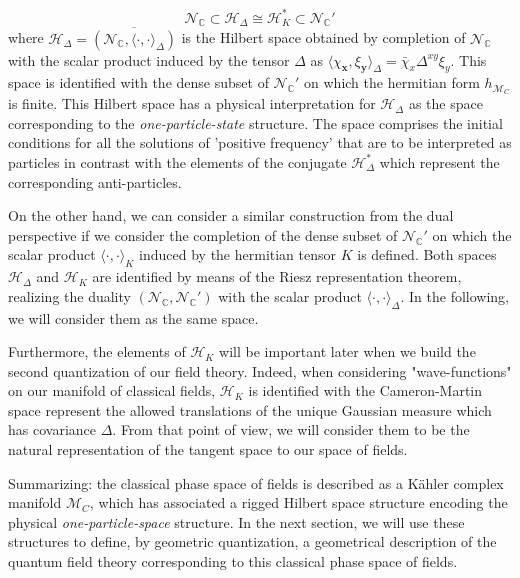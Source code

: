\documentclass[12pt]{article}%
\begin{document}
\begin{equation}
\label{eq:HolomorphicTriple}
\mathcal{N}_{\mathbb{C}}\subset \mathcal{H}_\Delta\cong \mathcal{H}_K^*\subset {\mathcal{N}_{\mathbb{C}}'}
\end{equation}
 where $\mathcal{H}_\Delta=\overline{(\mathcal{N}_{\mathbb{C}},\langle \cdot,\cdot\rangle_\Delta)}$ is the  Hilbert space obtained by completion of $\mathcal{N}_{\mathbb{C}}$ with the scalar product induced by  the tensor $\Delta$ as $\langle \chi_{\mathbf{x}},\xi_{\mathbf{y}}\rangle_\Delta=\bar{\chi}_x\Delta^{xy}\xi_y$.  This space is identified with the dense subset of $\mathcal{N}_{\mathbb{C}}'$ on which the hermitian form $h_{\mathcal{M}_C}$ is finite. This Hilbert space  has a physical interpretation for $\mathcal{H}_\Delta$ as the space corresponding to the \textit{one-particle-state} structure. The space comprises the initial conditions for all the solutions of 'positive frequency' that are to be interpreted as particles in contrast with the elements of the conjugate $\mathcal{H}_{\Delta}^*$ which represent the corresponding anti-particles.    

On the other hand, we can consider a similar construction from the dual perspective if we consider the completion of  the dense subset of $\mathcal{N}_{\mathbb{C}}'$ on which the scalar product $\langle \cdot,\cdot\rangle_K$ induced by the hermitian tensor $K$ is defined.  Both spaces $\mathcal{H}_\Delta$ and $\mathcal{H}_K$ are identified by means of the Riesz representation theorem,  realizing the duality  $(\mathcal{N}_{\mathbb{C}},\mathcal{N}_{\mathbb{C}}')$ with the scalar product  $\langle \cdot,\cdot\rangle_\Delta$.  In the following, we will consider them as the same space.

Furthermore, the elements of $\mathcal{H}_K$ will be important later when we build the second quantization of our field theory. Indeed, when considering "wave-functions" on our manifold of classical fields, $\mathcal{H}_K$ is identified with the Cameron-Martin space represent the allowed translations of the unique Gaussian measure which has covariance $\Delta$. From that point of view, we will consider them to be the natural representation of the tangent space to our space of fields.

Summarizing: the classical phase space of fields is described as a Kähler complex manifold $\mathcal{M}_C$, which has associated a rigged Hilbert space structure encoding the physical \textit{one-particle-space} structure. In the next section, we will use these structures to define, by geometric quantization, a geometrical description of the quantum field theory corresponding to this  classical phase space of fields. 
\end{document}
